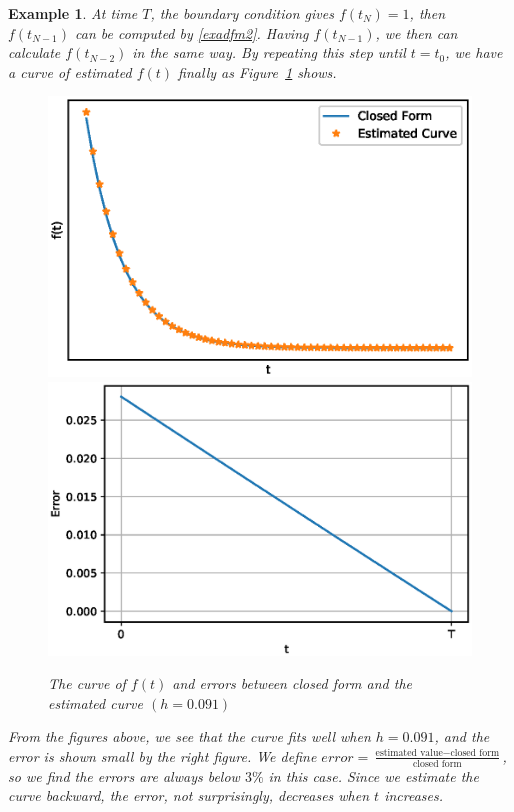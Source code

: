 \documentclass[a4paper]{article}
\newtheorem{exa}{Example}[section]
\theoremstyle{definition}
\numberwithin{equation}{section}
\begin{document}
\begin{exa}
At time $T$, the boundary condition gives $f(t_N)=1$, then $f(t_{N-1})$ can be computed by \eqref{exadfm2}. Having $f(t_{N-1})$, we then can calculate $f(t_{N-2})$ in the same way. By repeating this step until $t=t_0$, we have a curve of estimated $f(t)$ finally as Figure~\ref{fig:DPM0091} shows. 
\begin{figure}[H]
\centering
\includegraphics[scale=0.45]{DPMh0091.eps}
\includegraphics[scale=0.45]{DPMh0091error.eps}
\caption{The curve of $f(t)$ and errors between closed form and the estimated curve $(h=0.091)$}
\label{fig:DPM0091}
\end{figure}
From the figures above, we see that the curve fits well when $h=0.091$, and the error is shown small by the right figure. We define $error=\frac{\text{estimated value}-\text{closed form}}{\text{closed form}}$, so we find the errors are always below $3\%$ in this case. Since we estimate the curve backward, the error, not surprisingly, decreases when $t$ increases.


\end{exa}
\end{document}
